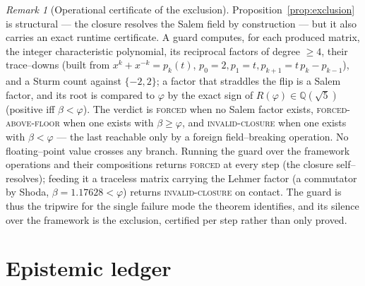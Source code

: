 \documentclass[11pt]{article}
\theoremstyle{plain}
\theoremstyle{definition}
\theoremstyle{remark}
\newtheorem{remark}[theorem]{Remark}
\newcommand{\Q}{\mathbb{Q}}
\begin{document}
\begin{remark}[Operational certificate of the exclusion]\label{rem:guard}
Proposition~\ref{prop:exclusion} is structural --- the closure resolves the Salem field by construction --- but it also carries an exact runtime certificate. A guard computes, for each produced matrix, the integer characteristic polynomial, its reciprocal factors of degree $\ge4$, their trace--downs (built from $x^k+x^{-k}=p_k(t)$, $p_0{=}2,p_1{=}t,p_{k+1}{=}t\,p_k-p_{k-1}$), and a Sturm count against $\{-2,2\}$; a factor that straddles the flip is a Salem factor, and its root is compared to $\varphi$ by the exact sign of $R(\varphi)\in\Q(\sqrt5)$ (positive iff $\beta<\varphi$). The verdict is \textsc{forced} when no Salem factor exists, \textsc{forced-above-floor} when one exists with $\beta\ge\varphi$, and \textsc{invalid-closure} when one exists with $\beta<\varphi$ --- the last reachable only by a foreign field--breaking operation. No floating--point value crosses any branch. Running the guard over the framework operations and their compositions returns \textsc{forced} at every step (the closure self--resolves); feeding it a traceless matrix carrying the Lehmer factor (a commutator by Shoda, $\beta=1.17628<\varphi$) returns \textsc{invalid-closure} on contact. The guard is thus the tripwire for the single failure mode the theorem identifies, and its silence over the framework is the exclusion, certified per step rather than only proved.
\end{remark}

\section{Epistemic ledger}\label{sec:ledger}
\end{document}
